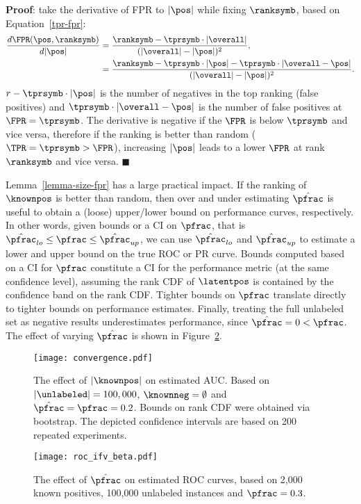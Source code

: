 \begin{lemma}
\textbf{Proof}: take the derivative of FPR to $|\pos|$ while fixing $\ranksymb$, based on Equation~\eqref{tpr-fpr}:
\begin{align}
\frac{d\FPR(\pos, \ranksymb)}{d|\pos|} &= \frac{\ranksymb-\tprsymb\cdot|\overall|}{(|\overall|-|\pos|)^2}, \nonumber \\
&= \frac{\ranksymb-\tprsymb\cdot|\pos| - \tprsymb \cdot|\overall-\pos|}{(|\overall|-|\pos|)^2}. \label{FPR_ifv_gamma}
\end{align}
$r-\tprsymb\cdot|\pos|$ is the number of negatives in the top ranking (false positives) and $\tprsymb\cdot|\overall - \pos|$ is the number of false positives at $\FPR=\tprsymb$. The derivative is negative if the $\FPR$ is below $\tprsymb$ and vice versa, therefore if the ranking is better than random ($\TPR = \tprsymb > \FPR$), increasing $|\pos|$ leads to a lower $\FPR$ at rank $\ranksymb$ and vice versa. \hfill $\blacksquare$
\end{lemma}

Lemma~\ref*{lemma-size-fpr} has a large practical impact. If the ranking of $\knownpos$ is better than random, then over and under estimating $\hat{\pfrac}$ is useful to obtain a (loose) upper/lower bound on performance curves, respectively. In other words, given bounds or a CI on $\pfrac$, that is $\hat{\pfrac}_{lo} \leq \pfrac \leq \hat{\pfrac}_{up}$, we can use $\hat{\pfrac}_{lo}$ and $\hat{\pfrac}_{up}$ to estimate a lower and upper bound on the true ROC or PR curve. Bounds computed based on a CI for $\pfrac$ constitute a CI for the performance metric (at the same confidence level), assuming the rank CDF of $\latentpos$ is contained by the confidence band on the rank CDF. Tighter bounds on $\pfrac$ translate directly to tighter bounds on performance estimates. Finally, treating the full unlabeled set as negative results underestimates performance, since $\hat{\pfrac}=0 < \pfrac$. The effect of varying $\hat{\pfrac}$ is shown in Figure~\ref{fig:roc-ifv-beta}.

\begin{figure}[!h]
	\centering
	\texttt{[image: convergence.pdf]}
	\vfill	
	\caption{The effect of $|\knownpos|$ on estimated AUC. Based on $|\unlabeled| = 100,000$, $\knownneg=\emptyset$ and $\hat{\pfrac}=\pfrac=0.2$. Bounds on rank CDF were obtained via bootstrap. The depicted confidence intervals are based on 200 repeated experiments.}
	\label{fig:convergence}
\end{figure}
\begin{figure}[!h]
	\centering
	\centering
	\texttt{[image: roc\_ifv\_beta.pdf]}
	\vfill
	\caption{The effect of $\hat{\pfrac}$ on estimated ROC curves, based on 2,000 known positives, 100,000 unlabeled instances and $\pfrac=0.3$.}
	\label{fig:roc-ifv-beta}
\end{figure}

